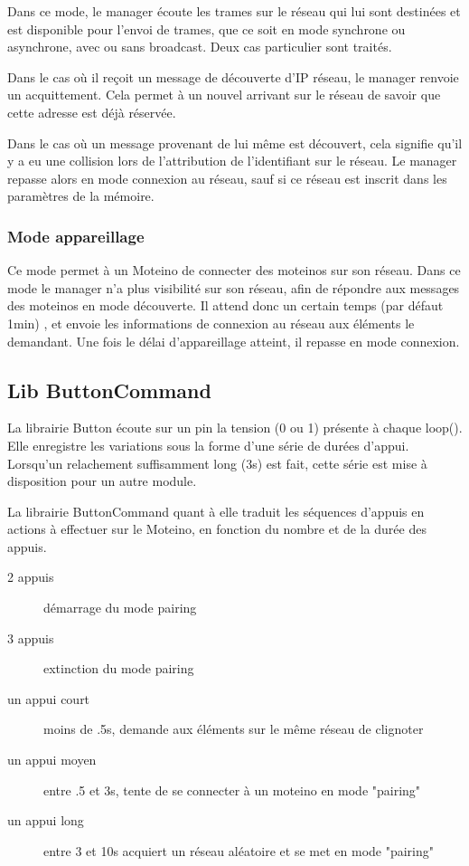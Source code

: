 \documentclass[a4paper]{report}
\begin{document}
Dans ce mode, le manager écoute les trames sur le réseau qui lui sont destinées et est disponible pour l'envoi de trames, que ce soit en mode synchrone ou asynchrone, avec ou sans broadcast. Deux cas particulier sont traités.

Dans le cas où il reçoit un message de découverte d'IP réseau, le manager renvoie un acquittement. Cela permet à un nouvel arrivant sur le réseau de savoir que cette adresse est déjà réservée.

Dans le cas où un message provenant de lui même est découvert, cela signifie qu'il y a eu une collision lors de l'attribution de l'identifiant sur le réseau. Le manager repasse alors en mode connexion au réseau, sauf si ce réseau est inscrit dans les paramètres de la mémoire.

\subsubsection{Mode appareillage}

Ce mode permet à un Moteino de connecter des moteinos sur son réseau. Dans ce mode le manager n'a plus visibilité sur son réseau, afin de répondre aux messages des moteinos en mode découverte. Il attend donc un certain temps (par défaut 1min) , et envoie les informations de connexion au réseau aux éléments le demandant. Une fois le délai d'appareillage atteint, il repasse en mode connexion.

\subsection{Lib ButtonCommand}

La librairie Button écoute sur un pin la tension (0 ou 1) présente à chaque loop(). Elle enregistre les variations sous la forme d'une série de durées d'appui. Lorsqu'un relachement suffisamment long (3s) est fait, cette série est mise à disposition pour un autre module.

La librairie ButtonCommand quant à elle traduit les séquences d'appuis en actions à effectuer sur le Moteino, en fonction du nombre et de la durée des appuis.
\begin{description}
\item[2 appuis] démarrage du mode pairing
\item[3 appuis] extinction du mode pairing
\item[un appui court] moins de .5s, demande aux éléments sur le même réseau de clignoter
\item[un appui moyen] entre .5 et 3s, tente de se connecter à un moteino en mode "pairing"
\item[un appui long] entre 3 et 10s acquiert un réseau aléatoire et se met en mode "pairing"
\end{description}
\end{document}
